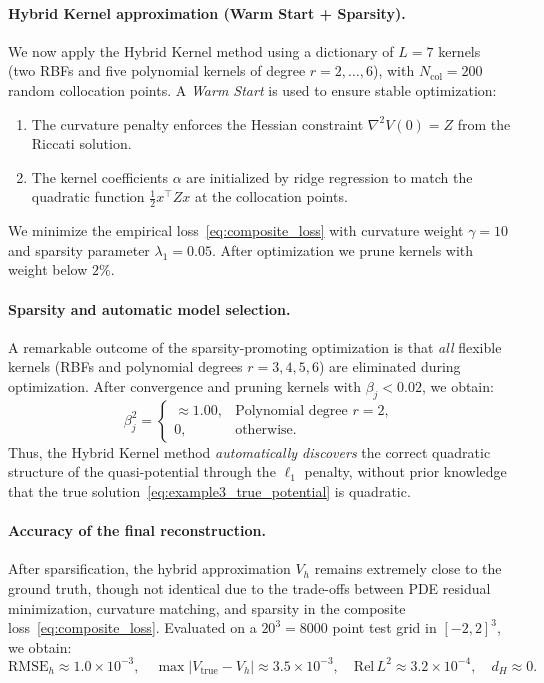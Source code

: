 \documentclass[11pt]{article}
\theoremstyle{plain}      %
\theoremstyle{definition} %
\begin{document}
\paragraph{Hybrid Kernel approximation (Warm Start + Sparsity).}
We now apply the Hybrid Kernel method using a dictionary of $L=7$ kernels  
(two RBFs and five polynomial kernels of degree $r=2,\dots,6$), with  
$N_{\mathrm{col}}=200$ random collocation points.
A \emph{Warm Start} is used to ensure stable optimization:
\begin{enumerate}
    \item The curvature penalty enforces the Hessian constraint
    $\nabla^2 V(0)=Z$ from the Riccati solution.
    \item The kernel coefficients $\alpha$ are initialized by ridge regression
    to match the quadratic function $\tfrac12 x^\top Z x$ at the collocation points.
\end{enumerate}
We minimize the empirical loss~\eqref{eq:composite_loss}
with curvature weight $\gamma=10$ and sparsity parameter $\lambda_1=0.05$.
After optimization we prune kernels with weight below $2\%$.

\paragraph{Sparsity and automatic model selection.}
A remarkable outcome of the sparsity-promoting optimization is that \textit{all} 
flexible kernels (RBFs and polynomial degrees $r = 3, 4, 5, 6$) are eliminated 
during optimization. After convergence and pruning kernels with $\beta_j < 0.02$, 
we obtain:
\begin{equation}\label{eq:example3_sparsity}
\beta_j^2 = 
\begin{cases}
\approx 1.00, & \text{Polynomial degree } r=2, \\
0, & \text{otherwise.}
\end{cases}
\end{equation}
Thus, the Hybrid Kernel method \textit{automatically discovers} the correct 
quadratic structure of the quasi-potential through the $\ell_1$ penalty, without 
prior knowledge that the true solution~\eqref{eq:example3_true_potential} is 
quadratic.

\paragraph{Accuracy of the final reconstruction.}
After sparsification, the hybrid approximation $V_h$ remains extremely close to 
the ground truth, though not identical due to the trade-offs between PDE residual 
minimization, curvature matching, and sparsity in the composite 
loss~\eqref{eq:composite_loss}. Evaluated on a $20^3 = 8000$ point test grid in 
$[-2, 2]^3$, we obtain:
\begin{equation}\label{eq:example3_errors}
\text{RMSE}_h \approx 1.0 \times 10^{-3}, \quad 
\max|V_{\text{true}} - V_h| \approx 3.5 \times 10^{-3}, \quad 
\text{Rel}\,L^2 \approx 3.2 \times 10^{-4}, \quad 
d_H \approx 0.
\end{equation}
\end{document}

